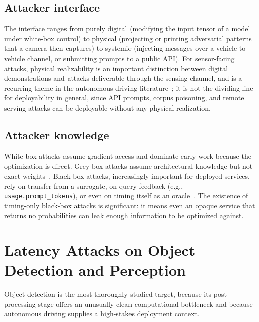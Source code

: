 \documentclass[acmsmall,screen,review,nonacm]{acmart}
\begin{document}
\subsection{Attacker interface}
The interface ranges from purely digital (modifying the input tensor of a model under white-box control) to physical (projecting or printing adversarial patterns that a camera then captures) to systemic (injecting messages over a vehicle-to-vehicle channel, or submitting prompts to a public API). For sensor-facing attacks, physical realizability is an important distinction between digital demonstrations and attacks deliverable through the sensing channel, and is a recurring theme in the autonomous-driving literature~\cite{ma2024slowperception,muller2025detstorm}; it is not the dividing line for deployability in general, since API prompts, corpus poisoning, and remote serving attacks can be deployable without any physical realization.

\subsection{Attacker knowledge}
White-box attacks assume gradient access and dominate early work because the optimization is direct. Grey-box attacks assume architectural knowledge but not exact weights~\cite{du2024energy}. Black-box attacks, increasingly important for deployed services, rely on transfer from a surrogate, on query feedback (e.g., \texttt{usage.prompt\_tokens}), or even on timing itself as an oracle~\cite{nakai2021timing,zhang2025crabs}. The existence of timing-only black-box attacks is significant: it means even an opaque service that returns no probabilities can leak enough information to be optimized against.

\section{Latency Attacks on Object Detection and Perception}
\label{sec:od}
Object detection is the most thoroughly studied target, because its post-processing stage offers an unusually clean computational bottleneck and because autonomous driving supplies a high-stakes deployment context.
\end{document}
